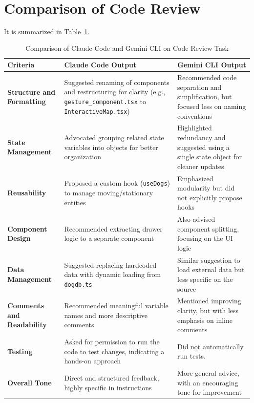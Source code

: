 \documentclass[9.5pt]{article}
\begin{document}
\section{Comparison of Code Review}
It is summarized in Table~\ref{tab:code_review_comparison}.
\begin{table}[h]
\centering
\caption{Comparison of Claude Code and Gemini CLI on Code Review Task}
\label{tab:code_review_comparison}
\renewcommand{\arraystretch}{1.2}
\begin{tabular}{|p{4cm}|p{5.5cm}|p{5.5cm}|}
\hline
\textbf{Criteria} & \textbf{Claude Code Output} & \textbf{Gemini CLI Output} \\
\hline
\textbf{Structure and Formatting} & Suggested renaming of components and restructuring for clarity (e.g., \texttt{gesture\_component.tsx} to \texttt{InteractiveMap.tsx}) & Recommended code separation and simplification, but focused less on naming conventions \\
\hline
\textbf{State Management} & Advocated grouping related state variables into objects for better organization & Highlighted redundancy and suggested using a single state object for cleaner updates \\
\hline
\textbf{Reusability} & Proposed a custom hook (\texttt{useDogs}) to manage moving/stationary entities & Emphasized modularity but did not explicitly propose hooks \\
\hline
\textbf{Component Design} & Recommended extracting drawer logic to a separate component & Also advised component splitting, focusing on the UI logic \\
\hline
\textbf{Data Management} & Suggested replacing hardcoded data with dynamic loading from \texttt{dogdb.ts} & Similar suggestion to load external data but less specific on the source \\
\hline
\textbf{Comments and Readability} & Recommended meaningful variable names and more descriptive comments & Mentioned improving clarity, but with less emphasis on inline comments \\
\hline
\textbf{Testing} & Asked for permission to run the code to test changes, indicating a hands-on approach & Did not automatically run tests. \\
\hline
\textbf{Overall Tone} & Direct and structured feedback, highly specific in instructions & More general advice, with an encouraging tone for improvement \\
\hline
\end{tabular}
\end{table}
\end{document}
